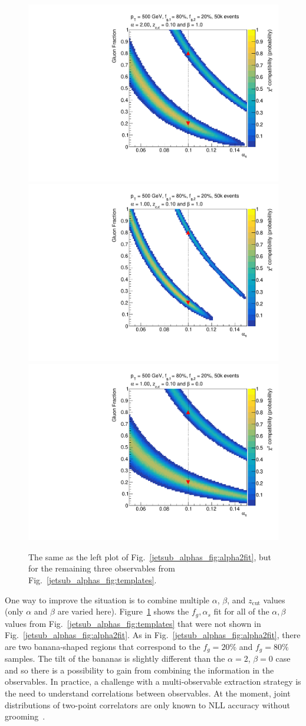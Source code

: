 \documentclass[11pt]{cernrep}
\begin{document}
\begin{figure}[t]
\begin{center}
\includegraphics[width = 0.32\columnwidth]{jetsub_alphas_banana_alpha_20beta_10_zcut_123451324.pdf}
\includegraphics[width = 0.32\columnwidth]{jetsub_alphas_banana_alpha_10beta_10_zcut_123451324.pdf}
\includegraphics[width = 0.32\columnwidth]{jetsub_alphas_banana_alpha_10beta_0_zcut_123451324.pdf}
\end{center}
\caption{The same as the left plot of Fig.~\ref{jetsub_alphas_fig:alpha2fit}, but for the remaining three observables from Fig.~\ref{jetsub_alphas_fig:templates}.}
\label{jetsub_alphas_fig:morebananas}
\end{figure}


One way to improve the situation is to combine multiple $\alpha$, $\beta$, and $z_\mathrm{cut}$ values (only $\alpha$ and $\beta$ are varied here).
%
Figure~\ref{jetsub_alphas_fig:morebananas} shows the $f_g,\alpha_s$ fit for all of the $\alpha,\beta$ values from Fig.~\ref{jetsub_alphas_fig:templates} that were not shown in Fig.~\ref{jetsub_alphas_fig:alpha2fit}.
%
As in Fig.~\ref{jetsub_alphas_fig:alpha2fit}, there are two banana-shaped regions that correspond to the $f_g=20\%$ and $f_g=80\%$ samples.
%
The tilt of the bananas is slightly different than the $\alpha=2$, $\beta=0$ case and so there is a possibility to gain from combining the information in the observables.
%
In practice, a challenge with a multi-observable extraction strategy is the need to understand correlations between observables.
%
At the moment, joint distributions of two-point correlators are only known to NLL accuracy without grooming~\cite{Larkoski:2014pca}.
\end{document}
